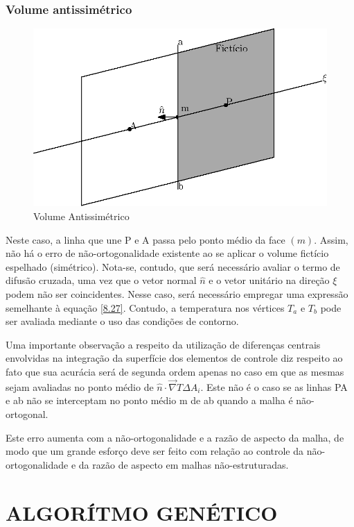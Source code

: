 \subsection{Volume antissimétrico}

\begin{figure}[]
    \centering
    \includegraphics{fig/contorno-2.eps}
    \caption{Volume Antissimétrico}
    \label{contorno-2}
\end{figure}

Neste caso, a linha que une P e A passa pelo ponto médio da face $(m)$. Assim, não há o erro de não-ortogonalidade existente ao se aplicar o volume fictício espelhado (simétrico). Nota-se, contudo, que será necessário avaliar o termo de difusão cruzada, uma vez que o vetor normal $\hat{n}$ e o vetor unitário na direção $\xi$ podem não ser coincidentes. Nesse caso, será necessário empregar uma expressão semelhante à equação \ref{8.27}. Contudo, a temperatura nos vértices $T_a$ e $T_b$ pode ser avaliada mediante o uso das condições de contorno.

Uma importante observação a respeito da utilização de diferenças centrais envolvidas na integração da superfície dos elementos de controle diz respeito ao fato que sua acurácia será de segunda ordem apenas no caso em que as mesmas sejam avaliadas no ponto médio de $\hat{n} \cdot \vec{\nabla}T \Delta A_i$. Este não é o caso se as linhas PA e ab não se interceptam no ponto médio m de ab quando a malha é não-ortogonal.

Este erro aumenta com a não-ortogonalidade e a razão de aspecto da malha, de modo que um grande esforço deve ser feito com relação ao controle da não-ortogonalidade e da razão de aspecto em malhas não-estruturadas.

\chapter[ALGORÍTMO GENÉTICO]{ALGORÍTMO GENÉTICO}

